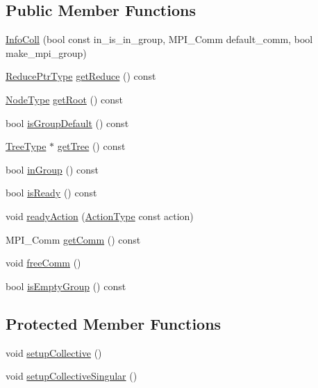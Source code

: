 \subsection*{Public Member Functions}
\begin{DoxyCompactItemize}
\item 
\hyperlink{structvt_1_1group_1_1_info_coll_a1181dfe3d01399d8e903d700461d2d7f}{Info\+Coll} (bool const in\+\_\+is\+\_\+in\+\_\+group, M\+P\+I\+\_\+\+Comm default\+\_\+comm, bool make\+\_\+mpi\+\_\+group)
\item 
\hyperlink{structvt_1_1group_1_1_info_coll_a1b9fe0214f622ed9e8987531f44ef1fa}{Reduce\+Ptr\+Type} \hyperlink{structvt_1_1group_1_1_info_coll_a297cafe0cae350b83a677db585865e62}{get\+Reduce} () const
\item 
\hyperlink{namespacevt_a866da9d0efc19c0a1ce79e9e492f47e2}{Node\+Type} \hyperlink{structvt_1_1group_1_1_info_coll_a5724786f46add3ccf7ca081774609f0c}{get\+Root} () const
\item 
bool \hyperlink{structvt_1_1group_1_1_info_coll_a6adf605b8d46a4174a8fd1321fd8fd3f}{is\+Group\+Default} () const
\item 
\hyperlink{structvt_1_1group_1_1_info_base_a96e01b6097ed7b2bc299027d0a7a1b1e}{Tree\+Type} $\ast$ \hyperlink{structvt_1_1group_1_1_info_coll_a2e7551dd6e85e5f3a6a7907b70f040c4}{get\+Tree} () const
\item 
bool \hyperlink{structvt_1_1group_1_1_info_coll_a09abdfe4684a0d7997441a97756ea237}{in\+Group} () const
\item 
bool \hyperlink{structvt_1_1group_1_1_info_coll_aec831cf27c5e2492657c5a2209718ae0}{is\+Ready} () const
\item 
void \hyperlink{structvt_1_1group_1_1_info_coll_ad2eb5a689e4b035e51a0a7db9fffd488}{ready\+Action} (\hyperlink{namespacevt_ae0a5a7b18cc99d7b732cb4d44f46b0f3}{Action\+Type} const action)
\item 
M\+P\+I\+\_\+\+Comm \hyperlink{structvt_1_1group_1_1_info_coll_a9f9dfa148d52cdc913fbaf1398f1fb48}{get\+Comm} () const
\item 
void \hyperlink{structvt_1_1group_1_1_info_coll_a0461bfa4ce243b30df15e82f01195ad7}{free\+Comm} ()
\item 
bool \hyperlink{structvt_1_1group_1_1_info_coll_aac6d23631b03488d45b95448b2a1e391}{is\+Empty\+Group} () const
\end{DoxyCompactItemize}
\subsection*{Protected Member Functions}
\begin{DoxyCompactItemize}
\item 
void \hyperlink{structvt_1_1group_1_1_info_coll_ad6053b31361b42674c4a72cc076e4636}{setup\+Collective} ()
\item 
void \hyperlink{structvt_1_1group_1_1_info_coll_a89ff0c94d9e1019761d7fb019835621c}{setup\+Collective\+Singular} ()
\end{DoxyCompactItemize}
